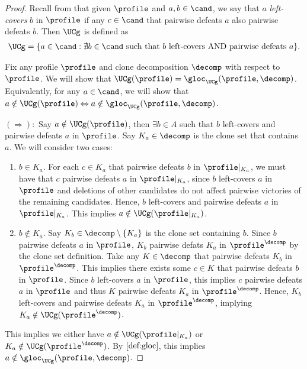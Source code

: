 \ucg*
\begin{proof}
    Recall from  that given $\profile$ and $a,b \in \cand$, we say that $a$ \emph{left-covers} $b$ in $\profile$ if any $c \in \cand$ that pairwise defeats $a$ also pairwise defeats $b$. Then $\UCg$ is defined as
    \begin{align*}
        \UCg=\{a \in \cand: \nexists b \in \cand\text{ such that }b\text{ left-covers AND pairwise defeats }a\}.
    \end{align*}

    Fix any profile $\profile$ and clone decomposition $\decomp$ with respect to $\profile$. We will show that $\UCg(\profile)= \gloc_\UCg(\profile, \decomp)$. Equivalently, for any $a \in \cand$, we will show that $a \notin \UCg(\profile) \Leftrightarrow a \notin \gloc_\UCg(\profile, \decomp)$. 
    
    \noindent $(\Rightarrow):$ Say $a \notin \UCg(\profile)$, then $\exists b \in A$ such that $b$ left-covers and pairwise defeats $a$ in $\profile$. Say $K_a \in \decomp$ is the clone set that contains $a$. We will consider two cases:
    \begin{enumerate}
        \item $b \in K_a$. For each $c \in K_a$ that pairwise defeats $b$ in $\profile|_{K_a}$, we must have that $c$ pairwise defeats $a$ in $\profile|_{K_a}$, since $b$ left-covers $a$ in $\profile$ and deletions of other candidates do not affect pairwise victories of the remaining candidates. Hence, $b$ left-covers and pairwise defeats $a$ in $\profile|_{K_a}$. This implies $a \notin \UCg(\profile|_{K_a})$. 
        \item $b \notin K_a$. Say $K_b \in \decomp \setminus \{K_a\}$ is the clone set containing $b$. Since $b$ pairwise defeats $a$ in $\profile$, $K_b$ pairwise defats $K_a$ in $\profile^{\decomp}$ by the clone set definition. Take any $K \in \decomp$ that pairwise defeats $K_b$ in $\profile^\decomp$. This implies there exists some $c \in K$ that pairwise defeats $b$ in $\profile$. Since $b$ left-covers $a$ in $\profile$, this implies $c$ pairwise defeats $a$ in $\profile$ and thus $K$ pairwise defeats $K_a$ in $\profile^\decomp$. Hence, $K_b$ left-covers and pairwise defeats $K_a$ in $\profile^\decomp$, implying $K_a \notin \UCg(\profile^\decomp)$.
    \end{enumerate}
    This implies we either have $a \notin \UCg(\profile|_{K_a})$ or $K_a \notin \UCg(\profile^\decomp)$. By $\Cref{def:gloc}$, this implies $a \notin \gloc_{\UCg}(\profile, \decomp)$.


\end{proof}
